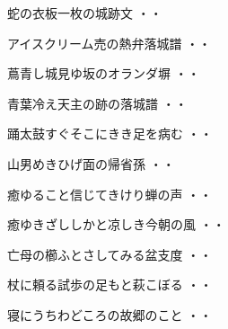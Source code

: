 \vspace{0.6cm}
\begin{shiika}蛇の衣板一枚の城跡文
\hfill{・・}\end{shiika}
\vspace{0.6cm}
\begin{shiika}アイスクリーム売の熱弁落城譜
\hfill{・・}\end{shiika}
\vspace{0.6cm}
\begin{shiika}蔦青し城見ゆ坂のオランダ塀
\hfill{・・}\end{shiika}
\vspace{0.6cm}
\begin{shiika}青葉冷え天主の跡の落城譜
\hfill{・・}\end{shiika}
\vspace{0.6cm}
\begin{shiika}踊太鼓すぐそこにきき足を病む
\hfill{・・}\end{shiika}
\vspace{0.6cm}
\begin{shiika}山男めきひげ面の帰省孫
\hfill{・・}\end{shiika}
\vspace{0.6cm}
\begin{shiika}癒ゆること信じてきけり蝉の声
\hfill{・・}\end{shiika}
\vspace{0.6cm}
\begin{shiika}癒ゆきざししかと凉しき今朝の風
\hfill{・・}\end{shiika}
\vspace{0.6cm}
\begin{shiika}亡母の櫛ふとさしてみる盆支度
\hfill{・・}\end{shiika}
\vspace{0.6cm}
\begin{shiika}杖に頼る試歩の足もと萩こぼる
\hfill{・・}\end{shiika}
\vspace{0.6cm}
\begin{shiika}寝にうちわどころの故郷のこと
\hfill{・・}\end{shiika}
